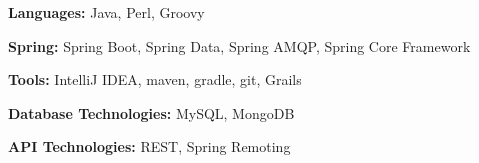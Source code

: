 \begin{cventries}
    {} %
    {} %
    {} %
    {\vspace{-0.5mm}
      \begin{cvitems} %
        \item {\textbf{Languages:} Java, Perl, Groovy}
        \item {\textbf{Spring:} Spring Boot, Spring Data, Spring AMQP, Spring Core Framework}
        \item {\textbf{Tools:} IntelliJ IDEA, maven, gradle, git, Grails}
        \item {\textbf{Database Technologies:} MySQL, MongoDB}
        \item {\textbf{API Technologies:} REST, Spring Remoting}
      \end{cvitems}
    }

\end{cventries}





